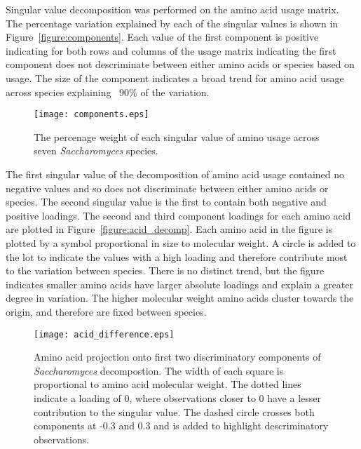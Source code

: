 Singular value decomposition was performed on the amino acid usage matrix. The percentage variation explained by each of the singular values is shown in Figure~\vref{figure:components}. Each value of the first component is positive indicating for both rows and columns of the usage matrix indicating the first component does not descriminate between either amino acids or species based on usage. The size of the component indicates a broad trend for amino acid usage across species explaining ~90\% of the variation.

\begin{figure}
  \centering
  \texttt{[image: components.eps]}
  \caption[Components of amino acid usage singular value decomposition]{The percenage weight of each singular value of amino usage across seven \emph{Saccharomyces} species.}
  \label{figure:components}
\end{figure}

The first singular value of the decomposition of amino acid usage contained no negative values and so does not discriminate between either amino acids or species. The second singular value is the first to contain both negative and positive loadings. The second and third component loadings for each amino acid are plotted in Figure~\vref{figure:acid_decomp}. Each amino acid in the figure is plotted by a symbol proportional in size to molecular weight. A circle is added to the lot to indicate the values with a high loading and therefore contribute most to the variation between species. There is no distinct trend, but the figure indicates smaller amino acids have larger absolute loadings and explain a greater degree in variation. The higher molecular weight amino acids cluster towards the origin, and therefore are fixed between species.

\begin{figure}
  \centering
  \texttt{[image: acid\_difference.eps]}
  \caption[Amino acid projection onto first two discriminatory components of \emph{Saccharomyces} decompostion]{Amino acid projection onto first two discriminatory components of \emph{Saccharomyces} decompostion. The width of each square is proportional to amino acid molecular weight. The dotted lines indicate a loading of 0, where observations closer to 0 have a lesser contribution to the singular value. The dashed circle crosses both components at -0.3 and 0.3 and is added to highlight descriminatory observations.}
  \label{figure:acid_decomp}
\end{figure}

